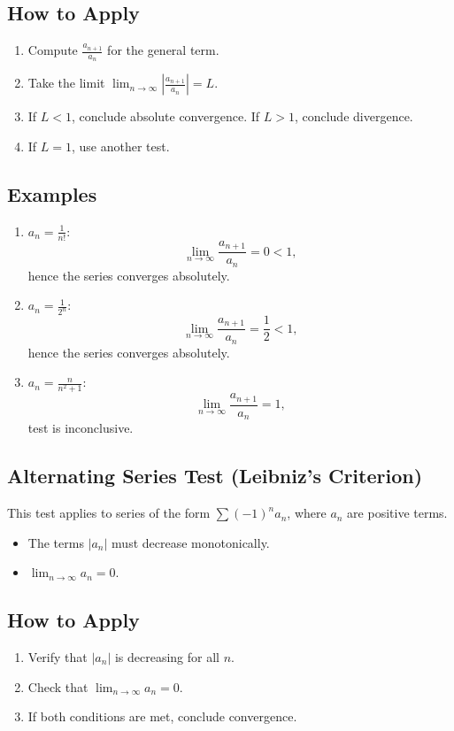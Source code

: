 \documentclass[a4paper, 12pt]{article}
\begin{document}
\subsection*{How to Apply}
\begin{enumerate}
    \item Compute \(\frac{a_{n+1}}{a_n}\) for the general term.
    \item Take the limit \(\lim_{n \to \infty} \left|\frac{a_{n+1}}{a_n}\right| = L\).
    \item If \(L < 1\), conclude absolute convergence. If \(L > 1\), conclude divergence.
    \item If \(L = 1\), use another test.
\end{enumerate}

\subsection*{Examples}
\begin{enumerate}
    \item \(a_n = \frac{1}{n!}\):
    \[\lim_{n \to \infty} \frac{a_{n+1}}{a_n} = 0 < 1,\]
    hence the series converges absolutely.

    \item \(a_n = \frac{1}{2^n}\):
    \[\lim_{n \to \infty} \frac{a_{n+1}}{a_n} = \frac{1}{2} < 1,\]
    hence the series converges absolutely.

    \item \(a_n = \frac{n}{n^2 + 1}\):
    \[\lim_{n \to \infty} \frac{a_{n+1}}{a_n} = 1,\]
    test is inconclusive.
\end{enumerate}

\subsection{Alternating Series Test (Leibniz's Criterion)}
This test applies to series of the form \(\sum (-1)^n a_n\), where \(a_n\) are positive terms.
\begin{itemize}
    \item The terms \(|a_n|\) must decrease monotonically.
    \item \(\lim_{n \to \infty} a_n = 0\).
\end{itemize}

\subsection*{How to Apply}
\begin{enumerate}
    \item Verify that \(|a_n|\) is decreasing for all \(n\).
    \item Check that \(\lim_{n \to \infty} a_n = 0\).
    \item If both conditions are met, conclude convergence.
\end{enumerate}
\end{document}
